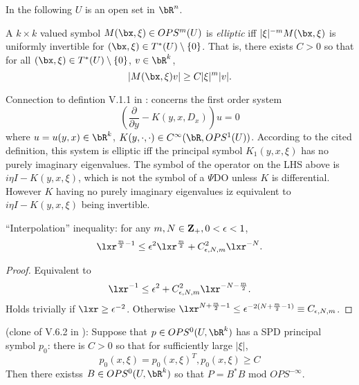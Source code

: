 
In the following $U$ is an open set in $\bR^n$.

\begin{definition}
  A $k \times k$ valued symbol $M(\bx,\xi) \in OPS^m(U)$ is {\em elliptic} iff $|\xi|^{-m}M(\bx,\xi)$ is uniformly invertible for $(\bx,\xi) \in T^*(U) \setminus \{0\}$. That is, there exists $C>0$ so that for all  $(\bx,\xi) \in T^*(U) \setminus \{0\}$, $v \in \bR^k$,
  \[
    |M(\bx,\xi)v| \ge C|\xi|^m|v|.
  \]
\end{definition}

Connection to defintion V.1.1 in \cite{Tay:81}: concerns the first order system
\[
  (\frac{\partial}{\partial y} - K(y,x,D_x))u = 0
\]
where $u=u(y,x) \in \bR^k$, $K(y,\cdot,\cdot) \in C^{\infty}(\bR,OPS^1(U))$. According to the cited definition, this system is elliptic iff the principal symbol $K_1(y,x,\xi)$ has no purely imaginary eigenvalues. The symbol of the operator on the LHS above is $i\eta I - K(y,x,\xi)$, which is not the symbol of a $\Psi$DO unless $K$ is differential. However $K$ having no purely imaginary eigenvalues iz equivalent to  $i\eta I - K(y,x,\xi)$ being invertible.


\begin{lemma} \label{thm:lema1}
``Interpolation'' inequality: for any $m, N \in {\bf Z}_+, 0 < \epsilon < 1$,
\[
  \lxr^{\frac{m}{2}-1} \le \epsilon^2 \lxr^{\frac{m}{2}} + C^2_{\epsilon,N,m}\lxr^{-N}. 
\]
\end{lemma}

\begin{proof}
 Equivalent to
\[
  \lxr^{-1} \le \epsilon^2 + C^2_{\epsilon,N,m}\lxr^{-N-\frac{m}{2}}. 
\]
Holds trivially if $\lxr \ge \epsilon^{-2}$. Otherwise $\lxr^{N+\frac{m}{2}-1} \le \epsilon^{-2(N+\frac{m}{2}-1)} \equiv C_{\epsilon,N,m}$.
\end{proof}

\begin{proposition}
\label{thm:propa1}(clone of V.6.2 in \cite{Tay:81}): Suppose that $p \in OPS^0(U,\bR^k)$ has a SPD principal symbol $p_0$: there is $C > 0$ so that for sufficiently large $|\xi|$,
  \[
    p_0(x,\xi) = p_0(x,\xi)^T, p_0(x,\xi) \ge C
  \]
  Then there existss $B \in OPS^0(U,\bR^k)$ so that $P = B^*B \mbox{ mod } OPS^{-\infty}$.
\end{proposition}

